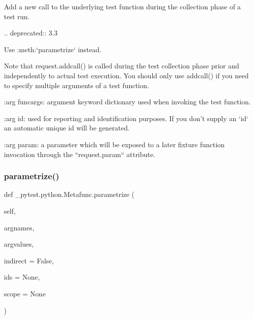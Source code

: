 \begin{DoxyVerb}Add a new call to the underlying test function during the collection phase of a test run.

.. deprecated:: 3.3

    Use :meth:`parametrize` instead.

Note that request.addcall() is called during the test collection phase prior and
independently to actual test execution.  You should only use addcall()
if you need to specify multiple arguments of a test function.

:arg funcargs: argument keyword dictionary used when invoking
    the test function.

:arg id: used for reporting and identification purposes.  If you
    don't supply an `id` an automatic unique id will be generated.

:arg param: a parameter which will be exposed to a later fixture function
    invocation through the ``request.param`` attribute.
\end{DoxyVerb}
 \mbox{\label{class__pytest_1_1python_1_1_metafunc_abc41169b0a1db224380e1f7aaa4e5eaa}} 
\subsubsection{\texorpdfstring{parametrize()}{parametrize()}}
{\footnotesize\ttfamily def \+\_\+pytest.\+python.\+Metafunc.\+parametrize (\begin{DoxyParamCaption}\item[{}]{self,  }\item[{}]{argnames,  }\item[{}]{argvalues,  }\item[{}]{indirect = {\ttfamily False},  }\item[{}]{ids = {\ttfamily None},  }\item[{}]{scope = {\ttfamily None} }\end{DoxyParamCaption})}

